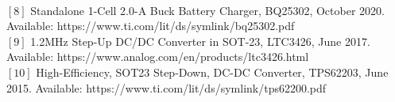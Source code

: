 \\ 
$[8]$ Standalone 1-Cell 2.0-A Buck Battery Charger, BQ25302, October 2020. Available: https://www.ti.com/lit/ds/symlink/bq25302.pdf
\vspace{3.5pt}
\\ 
$[9]$ 1.2MHz Step-Up DC/DC
Converter in SOT-23, LTC3426, June 2017. Available: https://www.analog.com/en/products/ltc3426.html
\vspace{3.5pt}
\\ 
$[10]$ High-Efficiency, SOT23 Step-Down, DC-DC Converter, TPS62203, June 2015. Available: https://www.ti.com/lit/ds/symlink/tps62200.pdf